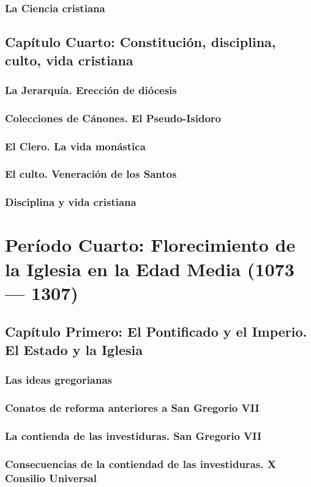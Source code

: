 \raggedbottom{} \documentclass[12pt, a4paper]{book}
\begin{document}
\section{La Ciencia cristiana}
\chapter{Capítulo Cuarto: Constitución, disciplina, culto, vida cristiana}
\section{La Jerarquía. Erección de diócesis}
\section{Colecciones de Cánones. El Pseudo-Isidoro}
\section{El Clero. La vida monástica}
\section{El culto. Veneración de los Santos}
\section{Disciplina y vida cristiana}
\part{Período Cuarto: Florecimiento de la Iglesia en la Edad Media (1073 --- 1307)}
\chapter{Capítulo Primero: El Pontificado y el Imperio. El Estado y la Iglesia}
\section{Las ideas gregorianas}
\section{Conatos de reforma anteriores a San Gregorio VII}
\section{La contienda de las investiduras. San Gregorio VII}
\section{Consecuencias de la contiendad de las investiduras. X Consilio Universal}
\end{document}
